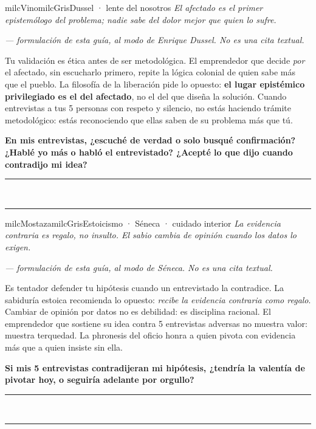 \documentclass[11pt,letterpaper]{article}
\newcommand{\linead}[1]{\noindent\color{milcLinea}\rule{#1}{0.5pt}\color{milcNegro}}
\begin{document}
\begin{softbox}{milcVino}{milcGris}{Dussel · lente del nosotros}
\textit{El afectado es el primer epistemólogo del problema; nadie sabe del dolor mejor que quien lo sufre.}

{\footnotesize\itshape\color{milcNegro!70}--- formulación de esta guía, al modo de Enrique Dussel. No es una cita textual.}

Tu validación es ética antes de ser metodológica. El emprendedor que decide \emph{por} el afectado, sin escucharlo primero, repite la lógica colonial de quien sabe más que el pueblo. La filosofía de la liberación pide lo opuesto: \textbf{el lugar epistémico privilegiado es el del afectado}, no el del que diseña la solución. Cuando entrevistas a tus 5 personas con respeto y silencio, no estás haciendo trámite metodológico: estás reconociendo que ellas saben de su problema más que tú.

\textbf{En mis entrevistas, ¿escuché de verdad o solo busqué confirmación? ¿Hablé yo más o habló el entrevistado? ¿Acepté lo que dijo cuando contradijo mi idea?}
\end{softbox}
\linead{\linewidth}\\[1mm]
\linead{\linewidth}

\begin{softbox}{milcMostaza}{milcGris}{Estoicismo · Séneca · cuidado interior}
\textit{La evidencia contraria es regalo, no insulto. El sabio cambia de opinión cuando los datos lo exigen.}

{\footnotesize\itshape\color{milcNegro!70}--- formulación de esta guía, al modo de Séneca. No es una cita textual.}

Es tentador defender tu hipótesis cuando un entrevistado la contradice. La sabiduría estoica recomienda lo opuesto: \emph{recibe la evidencia contraria como regalo}. Cambiar de opinión por datos no es debilidad: es disciplina racional. El emprendedor que sostiene su idea contra 5 entrevistas adversas no muestra valor: muestra terquedad. La phronesis del oficio honra a quien pivota con evidencia más que a quien insiste sin ella.

\textbf{Si mis 5 entrevistas contradijeran mi hipótesis, ¿tendría la valentía de pivotar hoy, o seguiría adelante por orgullo?}
\end{softbox}
\linead{\linewidth}\\[1mm]
\linead{\linewidth}
\end{document}
